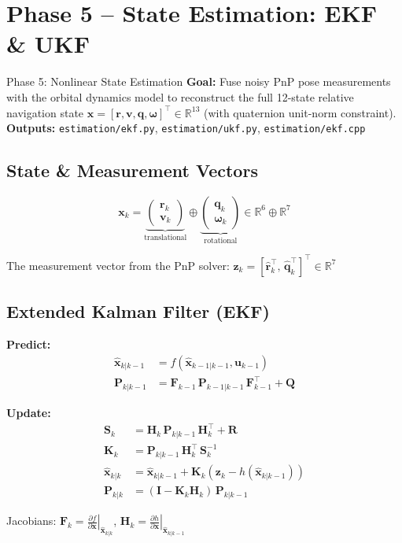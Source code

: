 \documentclass[12pt, a4paper]{article}
\newcommand{\vr}{\mathbf{r}}
\newcommand{\vv}{\mathbf{v}}
\newcommand{\vx}{\mathbf{x}}
\newcommand{\vcu}{\mathbf{u}}
\newcommand{\vq}{\mathbf{q}}
\newcommand{\vw}{\bm{\omega}}
\newcommand{\mP}{\mathbf{P}}
\newcommand{\mQ}{\mathbf{Q}}
\newcommand{\mR}{\mathbf{R}}
\newcommand{\mK}{\mathbf{K}}
\newcommand{\mH}{\mathbf{H}}
\newcommand{\mF}{\mathbf{F}}
\begin{document}
\section{Phase 5 -- State Estimation: EKF \& UKF}

\begin{phasebox}{Phase 5: Nonlinear State Estimation}
\textbf{Goal:} Fuse noisy PnP pose measurements with the orbital dynamics
model to reconstruct the full 12-state relative navigation state
$\vx = [\vr, \vv, \vq, \vw]^\top \in \mathbb{R}^{13}$ (with quaternion
unit-norm constraint).\\[0.5em]
\textbf{Outputs:} \texttt{estimation/ekf.py}, \texttt{estimation/ukf.py},
\texttt{estimation/ekf.cpp}
\end{phasebox}

\subsection{State \& Measurement Vectors}

\begin{equation}
\vx_k =
\underbrace{\begin{pmatrix} \vr_k \\ \vv_k \end{pmatrix}}_{\text{translational}}
\oplus
\underbrace{\begin{pmatrix} \vq_k \\ \vw_k \end{pmatrix}}_{\text{rotational}}
\in \mathbb{R}^{6} \oplus \mathbb{R}^{7}
\end{equation}

The measurement vector from the PnP solver:
$\mathbf{z}_k = [\hat{\vr}_k^\top,\, \hat{\vq}_k^\top]^\top \in \mathbb{R}^{7}$

\subsection{Extended Kalman Filter (EKF)}

\begin{formulabox}[title=EKF Predict--Update Cycle]
\textbf{Predict:}
\begin{align}
\hat{\vx}_{k|k-1} &= f(\hat{\vx}_{k-1|k-1}, \vcu_{k-1}) \\
\mP_{k|k-1}       &= \mF_{k-1}\,\mP_{k-1|k-1}\,\mF_{k-1}^\top + \mQ
\end{align}

\textbf{Update:}
\begin{align}
\mathbf{S}_k &= \mH_k\,\mP_{k|k-1}\,\mH_k^\top + \mR \\
\mK_k        &= \mP_{k|k-1}\,\mH_k^\top\,\mathbf{S}_k^{-1} \\
\hat{\vx}_{k|k} &= \hat{\vx}_{k|k-1} + \mK_k\!\left(\mathbf{z}_k - h(\hat{\vx}_{k|k-1})\right) \\
\mP_{k|k}    &= (\mathbf{I} - \mK_k \mH_k)\,\mP_{k|k-1}
\end{align}

Jacobians: $\mF_k = \left.\frac{\partial f}{\partial \vx}\right|_{\hat{\vx}_{k|k}}$,\quad
$\mH_k = \left.\frac{\partial h}{\partial \vx}\right|_{\hat{\vx}_{k|k-1}}$
\end{formulabox}
\end{document}

